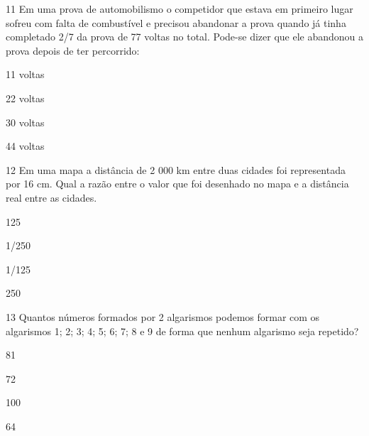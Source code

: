 \num{11} Em uma prova de automobilismo o competidor que estava em primeiro
lugar sofreu com falta de combustível e precisou abandonar a prova
quando já tinha completado 2/7 da prova de 77 voltas no total. Pode-se
dizer que ele abandonou a prova depois de ter percorrido:

\begin{escolha}
\item
  11 voltas
\item
  22 voltas
\item
  30 voltas
\item
  44 voltas
\end{escolha}


\num{12} Em uma mapa a distância de 2 000 km entre duas cidades foi
representada por 16 cm. Qual a razão entre o valor que foi desenhado no
mapa e a distância real entre as cidades.

\begin{escolha}
\item
  125
\item
  1/250
\item
  1/125
\item
  250
\end{escolha}


\num{13} Quantos números formados por 2 algarismos podemos formar com os
algarismos 1; 2; 3; 4; 5; 6; 7; 8 e 9 de forma que nenhum algarismo seja
repetido?

\begin{escolha}
\item
  81
\item
  72
\item
  100
\item
  64
\end{escolha}


